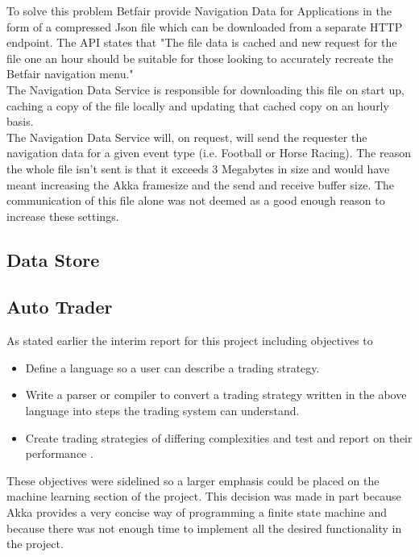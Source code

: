 		To solve this problem Betfair provide Navigation Data for Applications in the form of a compressed Json file which can be downloaded from a separate HTTP endpoint. The API states that "The file data is cached and new request for the file one an hour should be suitable for those looking to accurately recreate the Betfair navigation menu."\cite{BetfairNavigationData}\\
		
		The Navigation Data Service is responsible for downloading this file on start up, caching a copy of the file locally and updating that cached copy on an hourly basis.\\ 
		
		The Navigation Data Service will, on request, will send the requester the navigation data for a given event type (i.e. Football or Horse Racing). The reason the whole file isn't sent is that it exceeds 3 Megabytes in size and would have meant increasing the Akka framesize and the send and receive buffer size. The communication of this file alone was not deemed as a good enough reason to increase these settings.

	\subsection{Data Store}

	\subsection{Auto Trader}
		As stated earlier the interim report for this project including objectives to 

		\begin{itemize}
			\item Define a language so a user can describe a trading strategy.
			\item Write a parser or compiler to convert a trading strategy written in the above language into steps the trading system can understand.
			\item Create trading strategies of differing complexities and test and report on their performance	.	
		\end{itemize}
		
		These objectives were sidelined so a larger emphasis could be placed on the machine learning section of the project. This decision was made in part because Akka provides a very concise way of programming a finite state machine and because there was not enough time to implement all the desired functionality in the project.\\
		

